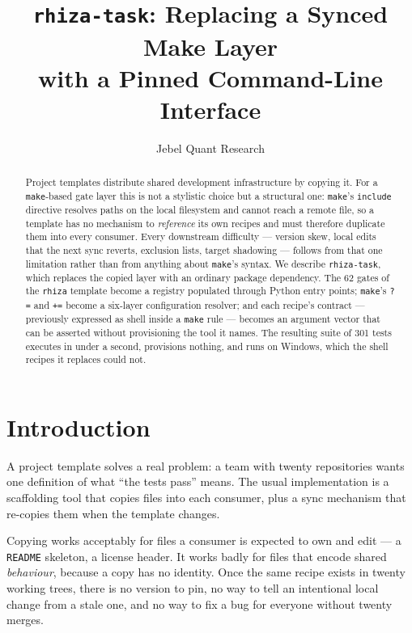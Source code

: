\documentclass[11pt,a4paper]{article}
\title{\texttt{rhiza-task}: Replacing a Synced Make Layer\\with a Pinned Command-Line Interface}
\author{Jebel Quant Research}
\date{}
\begin{document}
\maketitle

\begin{abstract}
Project templates distribute shared development infrastructure by copying it. For a
\texttt{make}-based gate layer this is not a stylistic choice but a structural one:
\texttt{make}'s \texttt{include} directive resolves paths on the local filesystem and
cannot reach a remote file, so a template has no mechanism to \emph{reference} its own
recipes and must therefore duplicate them into every consumer. Every downstream
difficulty --- version skew, local edits that the next sync reverts, exclusion lists,
target shadowing --- follows from that one limitation rather than from anything about
\texttt{make}'s syntax. We describe \texttt{rhiza-task}, which replaces the copied layer
with an ordinary package dependency. The 62 gates of the \texttt{rhiza} template become a
registry populated through Python entry points; \texttt{make}'s \texttt{?=} and \texttt{+=}
become a six-layer configuration resolver; and each recipe's contract --- previously
expressed as shell inside a \texttt{make} rule --- becomes an argument vector that can be
asserted without provisioning the tool it names. The resulting suite of 301 tests executes
in under a second, provisions nothing, and runs on Windows, which the shell recipes it
replaces could not.
\end{abstract}

\section{Introduction}

A project template solves a real problem: a team with twenty repositories wants one
definition of what ``the tests pass'' means. The usual implementation is a scaffolding
tool that copies files into each consumer, plus a sync mechanism that re-copies them when
the template changes.

Copying works acceptably for files a consumer is expected to own and edit --- a
\texttt{README} skeleton, a license header. It works badly for files that encode shared
\emph{behaviour}, because a copy has no identity. Once the same recipe exists in twenty
working trees, there is no version to pin, no way to tell an intentional local change from
a stale one, and no way to fix a bug for everyone without twenty merges.
\end{document}
